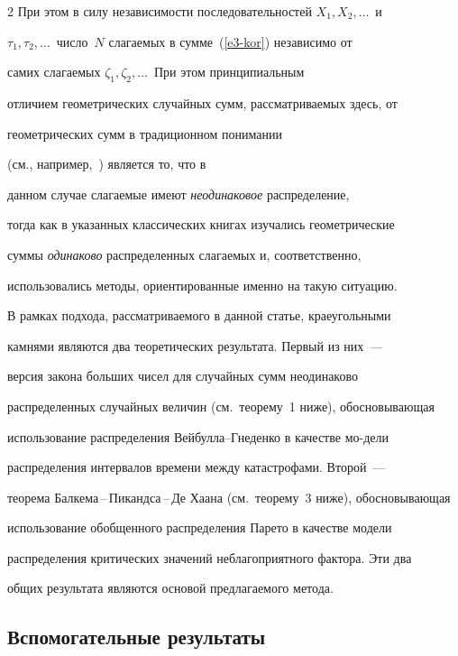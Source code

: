 \begin{multicols}{2}
При этом в силу независимости последовательностей $X_1,X_2,\ldots$\ и


$\tau_1,\tau_2,\ldots$\ число~$N$ слагаемых в сумме~(\ref{e3-kor}) независимо от


самих слагаемых $\zeta_1,\zeta_2,\ldots$\ При этом принципиальным


отличием гео\-мет\-ри\-че\-ских случайных сумм, рассматриваемых здесь, от


гео\-мет\-ри\-че\-ских сумм в традиционном понимании 


(см., например,~\cite{Kalashnikov1997, KorolevBeningShorgin2011}) является то, что в


данном случае слагаемые имеют \textit{неодинаковое} распределение,


тогда как в указанных классических книгах изуча\-лись геометрические


суммы \textit{одинаково} распределенных слагаемых и, соответственно,


использовались методы, ориентированные именно на такую ситуацию.





В рамках подхода, рассматриваемого в данной статье, краеугольными


камнями являются два тео\-ре\-ти\-че\-ских результата. Первый из них~---


версия закона больших чисел для случайных сумм неодинаково


распределенных случайных величин (см.\ теорему~1 ниже), обосновывающая


использование распределения Вей\-бул\-ла--Гне\-ден\-ко в качестве мо-\linebreak дели


распределения интервалов времени между катастрофа\-ми. Второй~---


теорема Бал\-ке\-ма\,--\,Пи\-канд\-са\,--\,Де Ха\-ана (см.\ теорему~3 ниже), обосновывающая


использование обобщенного распределения Парето в качестве модели


распределения критиче\-ских значений неблагоприятного фактора. Эти два


общих результата являются основой предлагаемого метода.





\subsection{Вспомогательные результаты}






\end{multicols}
